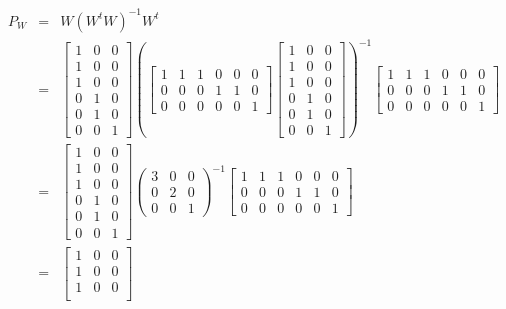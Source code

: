 \documentclass[12pt,a4paper]{report}
\begin{document}
\begin{enumerate}
\begin{enumerate}
\begin{eqnarray*}
P_W &=& W(W^tW)^{-1}W^t\\
&=& 
\begin{bmatrix}
1 & 0 & 0 \\
1 & 0 & 0 \\
1 & 0 & 0 \\
0 & 1 & 0 \\
0 & 1 & 0 \\
0 & 0 & 1
\end{bmatrix}
\left( \begin{bmatrix}
1 & 1 & 1 & 0 & 0 & 0 \\
0 & 0 & 0 & 1 & 1 & 0 \\
0 & 0 & 0 & 0 & 0 & 1
\end{bmatrix}
\begin{bmatrix}
1 & 0 & 0 \\
1 & 0 & 0 \\
1 & 0 & 0 \\
0 & 1 & 0 \\
0 & 1 & 0 \\
0 & 0 & 1
\end{bmatrix}
\right)^{-1}
\begin{bmatrix}
1 & 1 & 1 & 0 & 0 & 0 \\
0 & 0 & 0 & 1 & 1 & 0 \\
0 & 0 & 0 & 0 & 0 & 1
\end{bmatrix}\\
&=& \begin{bmatrix}
1 & 0 & 0 \\
1 & 0 & 0 \\
1 & 0 & 0 \\
0 & 1 & 0 \\
0 & 1 & 0 \\
0 & 0 & 1
\end{bmatrix}
\left(\begin{matrix}
3 & 0 & 0 \\
0 & 2 & 0 \\
0 & 0 & 1
\end{matrix}\right)^{-1}
\begin{bmatrix}
1 & 1 & 1 & 0 & 0 & 0 \\
0 & 0 & 0 & 1 & 1 & 0 \\
0 & 0 & 0 & 0 & 0 & 1
\end{bmatrix}\\
&=& \begin{bmatrix}
1 & 0 & 0 \\
1 & 0 & 0 \\
1 & 0 & 0 \\

\end{bmatrix}
\end{eqnarray*}
\end{enumerate}
\end{enumerate}
\end{document}
